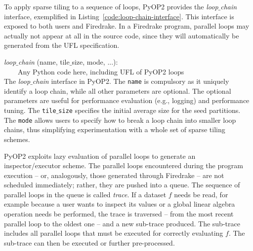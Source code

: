To apply sparse tiling to a sequence of loops, PyOP2 provides the {\em loop$\_$chain} interface, exemplified in Listing~\ref{code:loop-chain-interface}. This interface is exposed to both users and Firedrake. In a Firedrake program, parallel loops may actually not appear at all in the source code, since they will automatically be generated from the UFL specification.

\begin{algorithm}[htpb]
\scriptsize\ttfamily
{}
 {\em loop$\_$chain} (name, tile$\_$size, mode, ...):\\
~~~~Any Python code here, including UFL of PyOP2 loops\\
\caption{The {\em loop$\_$chain} interface in PyOP2. The {\tt name} is compulsory as it uniquely identify a loop chain, while all other parameters are optional. The optional parameters are useful for performance evaluation (e.g., logging) and performance tuning. The {\tt tile$\_$size} specifies the initial average size for the seed partitions. The {\tt mode} allows users to specify how to break a loop chain into smaller loop chains, thus simplifying experimentation with a whole set of sparse tiling schemes.}
\label{code:loop-chain-interface}
\end{algorithm}

PyOP2 exploits lazy evaluation of parallel loops to generate an inspector/executor scheme. The parallel loops encountered during the program execution -- or, analogously, those generated through Firedrake -- are not scheduled immediately; rather, they are pushed into a queue. The sequence of parallel loops in the queue is called {\em trace}. If a dataset $f$ needs be read, for example because a user wants to inspect its values or a global linear algebra operation needs be performed, the trace is traversed -- from the most recent parallel loop to the oldest one -- and a new sub-trace produced. The sub-trace includes all parallel loops that must be executed for correctly evaluating $f$. The sub-trace can then be executed or further pre-processed.

